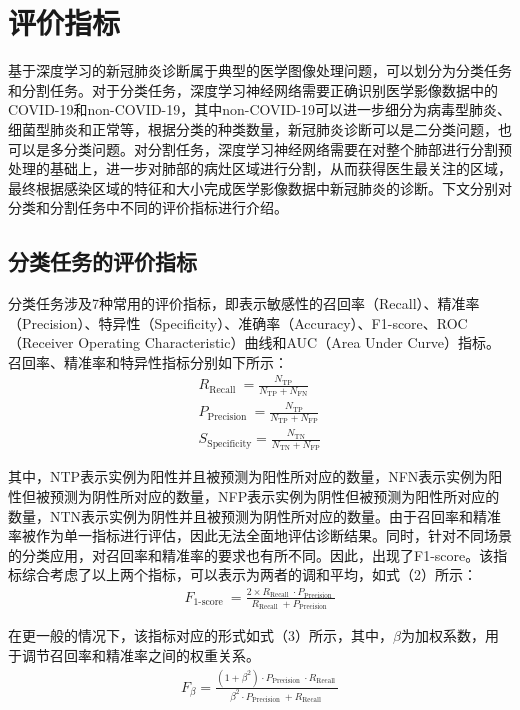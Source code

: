 \documentclass[journal,twoside,web]{ieeecolor}
\begin{document}
\section{评价指标}
基于深度学习的新冠肺炎诊断属于典型的医学图像处理问题，可以划分为分类任务和分割任务。对于分类任务，深度学习神经网络需要正确识别医学影像数据中的COVID-19和non-COVID-19，其中non-COVID-19可以进一步细分为病毒型肺炎、细菌型肺炎和正常等，根据分类的种类数量，新冠肺炎诊断可以是二分类问题，也可以是多分类问题。对分割任务，深度学习神经网络需要在对整个肺部进行分割预处理的基础上，进一步对肺部的病灶区域进行分割，从而获得医生最关注的区域，最终根据感染区域的特征和大小完成医学影像数据中新冠肺炎的诊断。下文分别对分类和分割任务中不同的评价指标进行介绍。
\subsection{分类任务的评价指标}
分类任务涉及7种常用的评价指标，即表示敏感性的召回率（Recall）、精准率（Precision）、特异性（Specificity）、准确率（Accuracy）、F1-score、ROC（Receiver Operating Characteristic）曲线和AUC（Area Under Curve）指标。召回率、精准率和特异性指标分别如下所示：
\begin{equation}
\begin{array}{l}
R_{\text {Recall }}=\frac{N_{\mathrm{TP}}}{N_{\mathrm{TP}}+N_{\mathrm{FN}}} \\
P_{\text {Precision }}=\frac{N_{\mathrm{TP}}}{N_{\mathrm{TP}}+N_{\mathrm{FP}}} \\
S_{\mathrm{Specificity}}=\frac{N_{\mathrm{TN}}}{N_{\mathrm{TN}}+N_{\mathrm{FP}}}
\end{array}
\end{equation}

其中，NTP表示实例为阳性并且被预测为阳性所对应的数量，NFN表示实例为阳性但被预测为阴性所对应的数量，NFP表示实例为阴性但被预测为阳性所对应的数量，NTN表示实例为阴性并且被预测为阴性所对应的数量。由于召回率和精准率被作为单一指标进行评估，因此无法全面地评估诊断结果。同时，针对不同场景的分类应用，对召回率和精准率的要求也有所不同。因此，出现了F1-score。该指标综合考虑了以上两个指标，可以表示为两者的调和平均，如式（2）所示：
\begin{equation}
\begin{array}{l}
F_{\text {1-score }}=\frac{2\times R_{\text {Recall }} \cdot P_{\text {Precision }}}{R_{\text {Recall }}+P_{\text {Precision }}}
\end{array}
\end{equation}

在更一般的情况下，该指标对应的形式如式（3）所示，其中，$\beta$为加权系数，用于调节召回率和精准率之间的权重关系。
\begin{equation}
\begin{array}{l}
F_{\beta}=\frac{\left(1+\beta^{2}\right) \cdot P_{\text {Precision }} \cdot R_{\text {Recall }}}{\beta^{2} \cdot P_{\text {Precision }}+R_{\text {Recall }}}
\end{array}
\end{equation}
\end{document}
